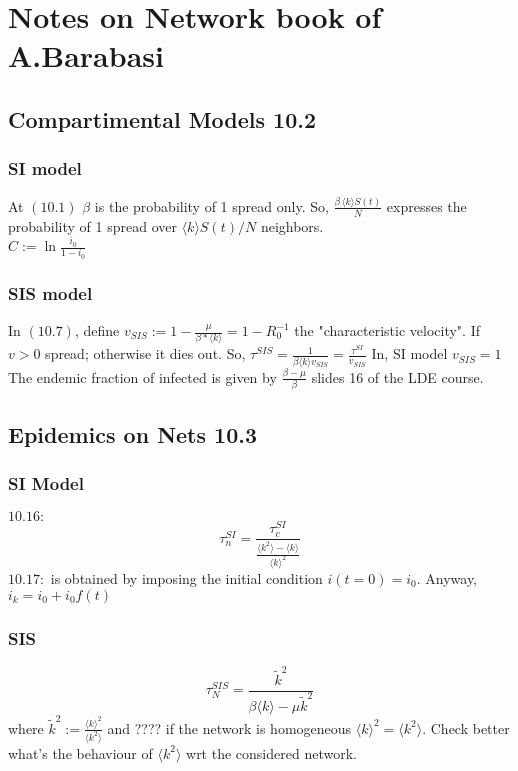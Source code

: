 \documentclass[a4paper,11pt,twoside]{report} %
\begin{document}
\section{Notes on Network book of A.Barabasi}

\subsection{Compartimental Models 10.2}
\subsubsection{SI model}
At $(10.1)$ $\beta$ is the probability of 1 spread only. So, $\frac{\beta \, \langle k \rangle S(t)}{N}$ expresses the probability of 1 spread over $\langle k\rangle S(t)/N$ neighbors. \\
$C:=\ln{\frac{i_0}{1-i_0}}$

\subsubsection{SIS model}

In $(10.7)$, define $v_{SIS}:=1-\frac{\mu}{\beta*\langle k\rangle }=1-R_0^{-1}$ the "characteristic velocity". If $v>0$ spread; otherwise it dies out. So, $\tau^{SIS}=\frac{1}{\beta\langle k\rangle v_{SIS}}=\frac{\tau^{SI}}{v_{SIS}}$ In, SI model $v_{SIS}=1$ \cite{barabasi::2016networkbook}
\newline
The endemic fraction of infected is given by $\frac{\beta-\mu}{\beta}$ slides 16 of the LDE course.

\subsection{Epidemics on Nets 10.3}

\subsubsection{SI Model}
$10.16:$ $$\tau_n^{SI}=\frac{\tau_{c}^{SI}}{\frac{\langle k^2 \rangle -\langle k\rangle}{\langle k\rangle^2}}$$
\newline
$10.17:$ is obtained by imposing the initial condition $i(t=0)=i_0$. Anyway, $i_k=i_0+i_0f(t)$

\subsubsection{SIS}

$$\tau_N^{SIS}=\frac{\tilde{k}^2}{\beta\langle k\rangle-\mu\tilde{k}^2}$$ 
\newline
where $\tilde{k}^2:=\frac{\langle k\rangle^2}{\langle k^2 \rangle }$ and ???? if the network is homogeneous
$\langle k\rangle^2=\langle k^2 \rangle .$
Check better what's the behaviour of $\langle k^2 \rangle $ wrt the considered network.
\end{document}
